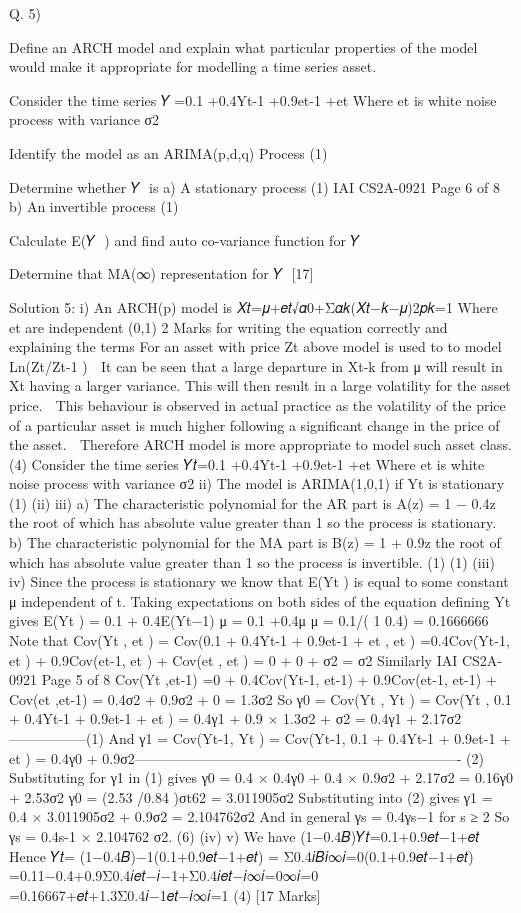 Q. 5) \item Define an ARCH model and explain what particular properties of the model would
make it appropriate for modelling a time series asset.

Consider the time series
𝑌􀯧=0.1 +0.4Yt-1 +0.9et-1 +et
Where et is white noise process with variance σ2
\item Identify the model as an ARIMA(p,d,q) Process (1)
\item Determine whether 𝑌􀯧 is
a) A stationary process
(1)
IAI CS2A-0921
Page 6 of 8
b) An invertible process (1)
\item Calculate E(𝑌􀯧 ) and find auto co-variance function for 𝑌􀯧 
\item Determine that MA(∞) representation for 𝑌􀯧 
[17]



Solution 5:
i)
An ARCH(p) model is 𝑋𝑡=𝜇+𝑒𝑡√𝛼0+Σ𝛼𝑘(𝑋𝑡−𝑘−𝜇)2𝑝𝑘=1
Where et are independent (0,1)
2 Marks for writing the equation correctly and explaining the terms
For an asset with price Zt above model is used to to model Ln(Zt/Zt-1 )
 It can be seen that a large departure in Xt-k from μ will result in Xt having a larger variance. This will then result in a large volatility for the asset price.
 This behaviour is observed in actual practice as the volatility of the price of a particular asset is much higher following a significant change in the price of the asset.
 Therefore ARCH model is more appropriate to model such asset class.
(4)
Consider the time series
𝑌𝑡=0.1 +0.4Yt-1 +0.9et-1 +et
Where et is white noise process with variance σ2
ii)
The model is ARIMA(1,0,1) if Yt is stationary
(1)
(ii)
iii)
a) The characteristic polynomial for the AR part is A(z) = 1 − 0.4z the root of which has absolute value greater than 1 so the process is stationary.
b) The characteristic polynomial for the MA part is B(z) = 1 + 0.9z the root of which has absolute value greater than 1 so the process is invertible.
(1)
(1)
(iii)
iv)
Since the process is stationary we know that E(Yt ) is equal to some constant μ independent of t.
Taking expectations on both sides of the equation defining Yt gives
E(Yt ) = 0.1 + 0.4E(Yt−1)
μ = 0.1 +0.4μ
μ = 0.1/( 1 0.4) = 0.1666666
Note that
Cov(Yt , et ) = Cov(0.1 + 0.4Yt-1 + 0.9et-1 + et , et )
=0.4Cov(Yt-1, et ) + 0.9Cov(et-1, et ) + Cov(et , et ) = 0 + 0 + σ2 = σ2
Similarly
IAI CS2A-0921
Page 5 of 8
Cov(Yt ,et-1) =0 + 0.4Cov(Yt-1, et-1) + 0.9Cov(et-1, et-1) + Cov(et ,et-1) = 0.4σ2 + 0.9σ2 + 0 = 1.3σ2
So
γ0 = Cov(Yt , Yt ) = Cov(Yt , 0.1 + 0.4Yt-1 + 0.9et-1 + et )
= 0.4γ1 + 0.9 × 1.3σ2 + σ2 = 0.4γ1 + 2.17σ2 -----------------(1)
And
γ1 = Cov(Yt-1, Yt ) = Cov(Yt-1, 0.1 + 0.4Yt-1 + 0.9et-1 + et )
= 0.4γ0 + 0.9σ2---------------------------------------------------------------------- (2)
Substituting for γ1 in (1) gives
γ0 = 0.4 × 0.4γ0 + 0.4 × 0.9σ2 + 2.17σ2 = 0.16γ0 + 2.53σ2
γ0 = (2.53 /0.84 )σt62 = 3.011905σ2
Substituting into (2) gives
γ1 = 0.4 × 3.011905σ2 + 0.9σ2 = 2.104762σ2
And in general
γs = 0.4γs−1 for s ≥ 2
So γs = 0.4s-1 × 2.104762 σ2.
(6)
(iv)
v)
We have (1−0.4𝐵)𝑌𝑡=0.1+0.9𝑒𝑡−1+𝑒𝑡
Hence 𝑌𝑡= (1−0.4𝐵)−1(0.1+0.9𝑒𝑡−1+𝑒𝑡) = Σ0.4𝑖𝐵𝑖∞𝑖=0(0.1+0.9𝑒𝑡−1+𝑒𝑡)
=0.11−0.4+0.9Σ0.4𝑖𝑒𝑡−𝑖−1+Σ0.4𝑖𝑒𝑡−𝑖∞𝑖=0∞𝑖=0 =0.16667+𝑒𝑡+1.3Σ0.4𝑖−1𝑒𝑡−𝑖∞𝑖=1
(4)
[17 Marks]

